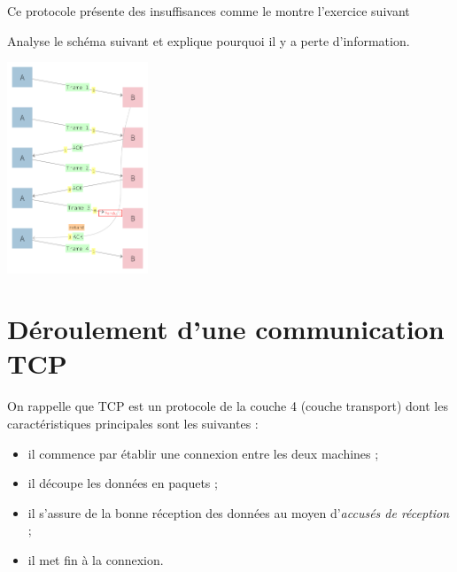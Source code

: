 \medskip\par

Ce protocole présente des insuffisances comme le montre l'exercice suivant

\begin{exercice}[]
    Analyse le schéma suivant et explique pourquoi il y a perte d'information.
    \begin{center}
        \includegraphics[width=4.2cm]{ch-transmissions/img/bit_alterne_4.png}
    \end{center}
\end{exercice}

\section{Déroulement d'une communication TCP}

On rappelle que TCP est un protocole de la couche 4 (couche transport) dont les caractéristiques principales sont les suivantes :
\begin{itemize}
    \item 	il commence par établir une connexion entre les deux machines ;
    \item 	il découpe les données en paquets ;
    \item 	il s'assure de la bonne réception des données au moyen d'\textit{accusés de réception} ;
    \item 	il met fin à la connexion.
\end{itemize}

